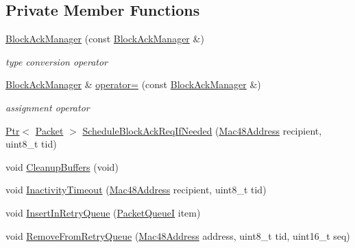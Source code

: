 \subsection*{Private Member Functions}
\begin{DoxyCompactItemize}
\item 
\hyperlink{classns3_1_1BlockAckManager_aa2506b792c32d3768a79112b2f2991c3}{Block\+Ack\+Manager} (const \hyperlink{classns3_1_1BlockAckManager}{Block\+Ack\+Manager} \&)
\begin{DoxyCompactList}\small\item\em type conversion operator \end{DoxyCompactList}\item 
\hyperlink{classns3_1_1BlockAckManager}{Block\+Ack\+Manager} \& \hyperlink{classns3_1_1BlockAckManager_ae3126b45e928e89144524d3c8226c071}{operator=} (const \hyperlink{classns3_1_1BlockAckManager}{Block\+Ack\+Manager} \&)
\begin{DoxyCompactList}\small\item\em assignment operator \end{DoxyCompactList}\item 
\hyperlink{classns3_1_1Ptr}{Ptr}$<$ \hyperlink{classns3_1_1Packet}{Packet} $>$ \hyperlink{classns3_1_1BlockAckManager_a2dd74462281ab81176310ad58a35f2ea}{Schedule\+Block\+Ack\+Req\+If\+Needed} (\hyperlink{classns3_1_1Mac48Address}{Mac48\+Address} recipient, uint8\+\_\+t tid)
\item 
void \hyperlink{classns3_1_1BlockAckManager_a27603e1b5ff9a9f5922b1056c75733e1}{Cleanup\+Buffers} (void)
\item 
void \hyperlink{classns3_1_1BlockAckManager_a7846b31a39f8e2c3302020e4c66ae31f}{Inactivity\+Timeout} (\hyperlink{classns3_1_1Mac48Address}{Mac48\+Address} recipient, uint8\+\_\+t tid)
\item 
void \hyperlink{classns3_1_1BlockAckManager_aa09e2e2b119ed7a054a580971cf950e3}{Insert\+In\+Retry\+Queue} (\hyperlink{classns3_1_1BlockAckManager_a2bb94802381e70535e8a7c892fd01d48}{Packet\+QueueI} item)
\item 
void \hyperlink{classns3_1_1BlockAckManager_aa7fc7ecdb5e0171b0e84bb39554f75e2}{Remove\+From\+Retry\+Queue} (\hyperlink{classns3_1_1Mac48Address}{Mac48\+Address} address, uint8\+\_\+t tid, uint16\+\_\+t seq)
\end{DoxyCompactItemize}
